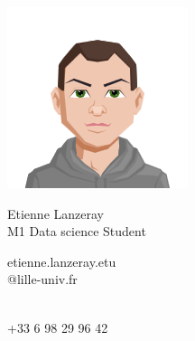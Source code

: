 \documentclass{article}
\begin{document}
\centering \includegraphics[width=.2\linewidth]{Avatar.png}\\[5pt]
\parbox{2in}{\Large \centering Etienne Lanzeray\\[1pt]
\normalsize M1 Data science Student}

\vfill
\raggedright
\begin{multicols}{2}
\small etienne.lanzeray.etu \\
\small @lille-univ.fr

\columnbreak
\raggedleft
\hfill \\
\small +33 6 98 29 96 42%
\end{multicols}%
\end{document}
